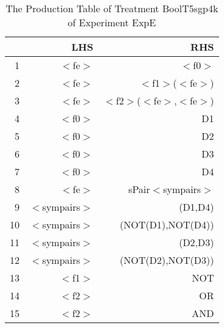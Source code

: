 \begin{table}[ht]
\centering
\begin{tabular}{rrr}
  \hline
 & LHS & RHS \\ 
  \hline
1 & $<$fe$>$ & $<$f0$>$ \\ 
  2 & $<$fe$>$ & $<$f1$>$($<$fe$>$) \\ 
  3 & $<$fe$>$ & $<$f2$>$($<$fe$>$,$<$fe$>$) \\ 
  4 & $<$f0$>$ & D1 \\ 
  5 & $<$f0$>$ & D2 \\ 
  6 & $<$f0$>$ & D3 \\ 
  7 & $<$f0$>$ & D4 \\ 
  8 & $<$fe$>$ & sPair$<$sympairs$>$ \\ 
  9 & $<$sympairs$>$ & (D1,D4) \\ 
  10 & $<$sympairs$>$ & (NOT(D1),NOT(D4)) \\ 
  11 & $<$sympairs$>$ & (D2,D3) \\ 
  12 & $<$sympairs$>$ & (NOT(D2),NOT(D3)) \\ 
  13 & $<$f1$>$ & NOT \\ 
  14 & $<$f2$>$ & OR \\ 
  15 & $<$f2$>$ & AND \\ 
   \hline
\end{tabular}
\caption{The Production Table of Treatment BoolT5sgp4k of Experiment ExpE} 
\end{table}
